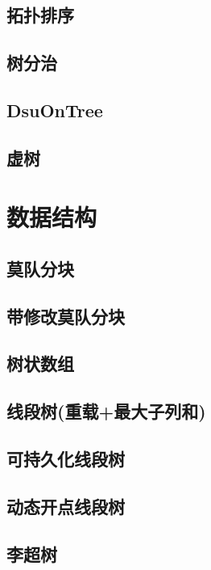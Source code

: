 \documentclass[10pt,a4paper]{article}
\begin{document}
\subsection{拓扑排序}

\subsection{树分治}

\subsection{DsuOnTree}

\subsection{虚树}

\section{数据结构}
\subsection{莫队分块}

\subsection{带修改莫队分块}

\subsection{树状数组}

\subsection{线段树(重载+最大子列和)}

\subsection{可持久化线段树}

\subsection{动态开点线段树}

\subsection{李超树}

\end{document}

